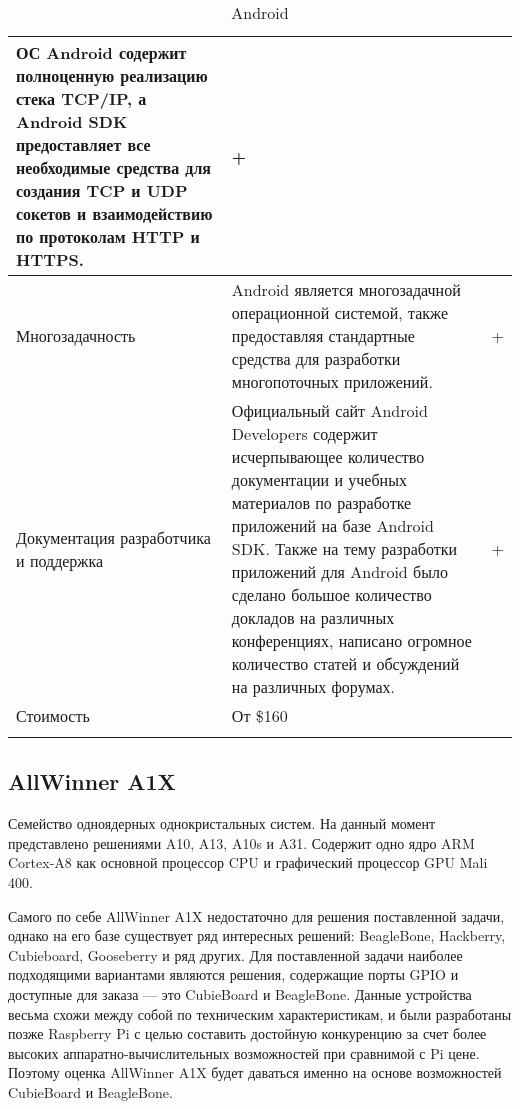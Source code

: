 \begin{longtable}{| p{} | p{} | c |}
ОС Android содержит полноценную реализацию стека TCP/IP, а Android SDK предоставляет все необходимые средства для создания TCP и UDP сокетов и взаимодействию по протоколам HTTP и HTTPS\cite{AndroidNetwork}. &

+\\

\hline
Многозадачность &

Android является многозадачной операционной системой, также предоставляя стандартные средства для разработки многопоточных приложений\cite{AndroidThreading}. &

+\\

\hline 
Документация разработчика и поддержка & 

Официальный сайт Android Developers содержит исчерпывающее количество документации и учебных материалов по разработке приложений на базе Android SDK. Также на тему разработки приложений для Android было сделано большое количество докладов на различных конференциях, написано огромное количество статей и обсуждений на различных форумах. &

+\\

\hline

Стоимость &

От \$160 \cite{AndroidBuy}&

\\

\hline
\caption{Android} %
\end{longtable}
\egroup

\subsection{AllWinner A1X}
Семейство одноядерных однокристальных систем. На данный момент представлено решениями A10, A13, A10s и A31. Содержит одно ядро ARM Cortex-A8 как основной процессор CPU и графический процессор GPU Mali 400\cite{AllWinner}.

Самого по себе AllWinner A1X недостаточно для решения поставленной задачи, однако на его базе существует ряд интересных решений: BeagleBone\cite{BeagleBone}, Hackberry\cite{Hackberry}, Cubieboard\cite{Cubieboard}, Gooseberry\cite{Gooseberry} и ряд других. Для поставленной задачи наиболее подходящими вариантами являются решения, содержащие порты GPIO и доступные для заказа --- это CubieBoard и BeagleBone. Данные устройства весьма схожи между собой по техническим характеристикам, и были разработаны позже Raspberry Pi с целью составить достойную конкуренцию за счет более высоких аппаратно-вычислительных возможностей при сравнимой с Pi цене. Поэтому оценка AllWinner A1X будет даваться именно на основе возможностей CubieBoard и BeagleBone.

